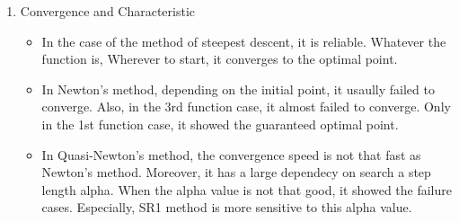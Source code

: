 \documentclass[../main.tex]{subfiles}
\begin{document}
\begin{enumerate}
    \item Convergence and Characteristic
    \begin{itemize}
        \item In the case of the method of steepest descent, it is reliable.
        Whatever the function is, Wherever to start, it converges to the optimal point.
        \item In Newton's method, depending on the initial point, it usaully failed to converge.
        Also, in the 3rd function case, it almost failed to converge. 
        Only in the 1st function case, it showed the guaranteed optimal point.
        \item In Quasi-Newton's method, the convergence speed is not that fast as Newton's method.
        Moreover, it has a large dependecy on search a step length alpha. When the alpha value is not that good, 
        it showed the failure cases. Especially, SR1 method is more sensitive to this alpha value.
    \end{itemize}
\end{enumerate}
    
\end{document}
